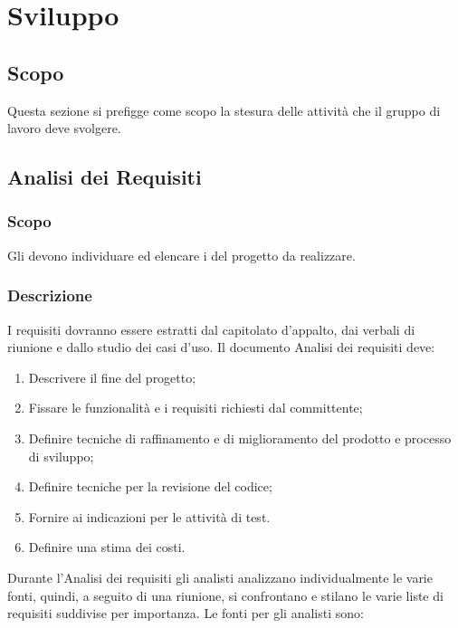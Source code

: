 \documentclass[../NomeDocumento.tex]{subfiles}
\begin{document}
	

\section{Sviluppo}

\subsection{Scopo}

Questa sezione si prefigge come scopo la stesura delle attività che il gruppo di lavoro deve svolgere.

\subsection{Analisi dei Requisiti}

	\subsubsection{Scopo} 
	
	Gli  devono individuare ed elencare i  del progetto da realizzare.
	
	\subsubsection{Descrizione}
	
	I requisiti dovranno essere estratti dal capitolato d’appalto, dai verbali di riunione e dallo studio dei casi d’uso. 
	Il documento Analisi dei requisiti deve:
	
	\begin{enumerate}
		\item Descrivere il fine del progetto;
		\item Fissare le funzionalità e i requisiti richiesti dal committente;
		\item Definire tecniche di raffinamento e di miglioramento del prodotto e processo di sviluppo;
		\item Definire tecniche per la revisione del codice;
		\item Fornire ai  indicazioni per le attività di test.
		\item Definire una stima dei costi.
	\end{enumerate}

	 Durante l’Analisi dei requisiti gli analisti analizzano individualmente le varie fonti, quindi, a seguito di una riunione, si confrontano e stilano le varie liste di requisiti suddivise per importanza. Le fonti per gli analisti sono:
	 
\end{document}

